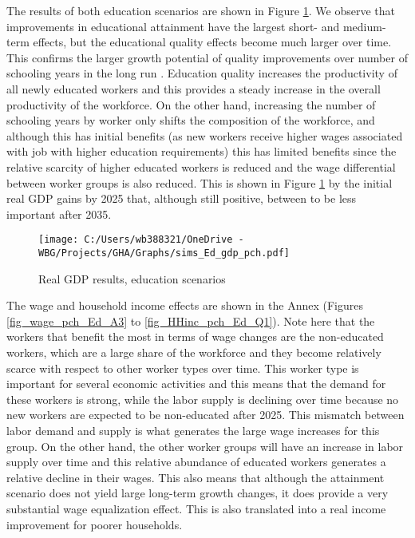 \documentclass[11pt,english]{article}
\begin{document}
The results of both education scenarios are shown in Figure \ref{fig_sim_Ed_gdp_pch}. We observe that improvements in educational attainment have the largest short- and medium-term effects, but the educational quality effects become much larger over time. This confirms the larger growth potential of quality improvements over number of schooling years in the long run \citep{Hanushek_Woessmann_2007,Hanushek_Woessmann_2008}. Education quality increases the productivity of all newly educated workers and this provides a steady increase in the overall productivity of the workforce. On the other hand, increasing the number of schooling years by worker only shifts the composition of the workforce, and although this has initial benefits (as new workers receive higher wages associated with job with higher education requirements) this has limited benefits since the relative scarcity of higher educated workers is reduced and the wage differential between worker groups is also reduced. This is shown in Figure \ref{fig_sim_Ed_gdp_pch} by the initial real GDP gains by 2025 that, although still positive, between to be less important after 2035.   

\begin{figure}[ht!]\caption{Real GDP results, education scenarios} \label{fig_sim_Ed_gdp_pch}
	\centering
	\texttt{[image: C:/Users/wb388321/OneDrive - WBG/Projects/GHA/Graphs/sims\_Ed\_gdp\_pch.pdf]}
\end{figure}

The wage and household income effects are shown in the Annex (Figures \ref{fig_wage_pch_Ed_A3} to \ref{fig_HHinc_pch_Ed_Q1}). Note here that the workers that benefit the most in terms of wage changes are the non-educated workers, which are a large share of the workforce and they become relatively scarce with respect to other worker types over time. This worker type is important for several economic activities and this means that the demand for these workers is strong, while the labor supply is declining over time because no new workers are expected to be non-educated after 2025. This mismatch between labor demand and supply is what generates the large wage increases for this group. On the other hand, the other worker groups will have an increase in labor supply over time and this relative abundance of educated workers generates a relative decline in their wages. This also means that although the attainment scenario does not yield large long-term growth changes, it does provide a very substantial wage equalization effect. This is also translated into a real income improvement for poorer households.
\end{document}
